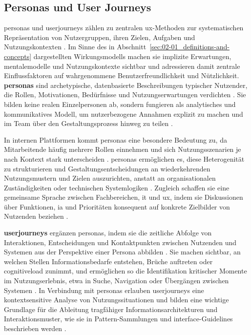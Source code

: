 \subsection{Personas und User Journeys}
\label{subsec:02-02-01_personas-and-journeys}

\Gls{personas} und \Gls{userjourneys} zählen zu zentralen \Gls{ux}-Methoden zur systematischen Repräsentation von Nutzergruppen, ihren Zielen, Aufgaben und Nutzungskontexten \cite{409:Cooper2014,410:Stickdorn2018}. Im Sinne des in Abschnitt~\ref{sec:02-01_definitions-and-concepts} dargestellten Wirkungsmodells machen sie implizite Erwartungen, \gls{mentalemodelle} und Nutzungskontexte sichtbar und adressieren damit zentrale Einflussfaktoren auf wahrgenommene Benutzerfreundlichkeit und Nützlichkeit. \textbf{\Gls{personas}} sind archetypische, datenbasierte Beschreibungen typischer Nutzender, die Rollen, Motivationen, Bedürfnisse und Nutzungserwartungen verdichten \cite{409:Cooper2014,905:Norman1983}. Sie bilden keine realen Einzelpersonen ab, sondern fungieren als analytisches und kommunikatives Modell, um nutzerbezogene Annahmen explizit zu machen und im Team über den Gestaltungsprozess hinweg zu teilen \cite{409:Cooper2014,410:Stickdorn2018}.

In internen Plattformen kommt \Gls{personas} eine besondere Bedeutung zu, da Mitarbeitende häufig mehrere Rollen einnehmen und sich Nutzungsszenarien je nach Kontext stark unterscheiden \cite{300:FraunhoferIESE2018,406:Albers2015}. \Gls{personas} ermöglichen es, diese Heterogenität zu strukturieren und Gestaltungsentscheidungen an wiederkehrenden Nutzungsmustern und Zielen auszurichten, anstatt an organisationalen Zuständigkeiten oder technischen Systemlogiken \cite{409:Cooper2014,406:Albers2015}. Zugleich schaffen sie eine gemeinsame Sprache zwischen Fachbereichen, \acrshort{it} und \Gls{ux}, indem sie Diskussionen über Funktionen, \Gls{ia} und Prioritäten konsequent auf konkrete Zielbilder von Nutzenden beziehen \cite{409:Cooper2014,410:Stickdorn2018}.

\textbf{\Gls{userjourneys}} ergänzen \Gls{personas}, indem sie die zeitliche Abfolge von Interaktionen, Entscheidungen und Kontaktpunkten zwischen Nutzenden und Systemen aus der Perspektive einer Persona abbilden \cite{410:Stickdorn2018}. Sie machen sichtbar, an welchen Stellen Informationsbedarfe entstehen, Brüche auftreten oder \gls{cognitiveload} zunimmt, und ermöglichen so die Identifikation kritischer Momente im Nutzungserlebnis, etwa in Suche, Navigation oder Übergängen zwischen Systemen \cite{410:Stickdorn2018,105:Sweller1988}. In Verbindung mit \Gls{personas} erlauben \Gls{userjourneys} eine kontextsensitive Analyse von Nutzungssituationen und bilden eine wichtige Grundlage für die Ableitung tragfähiger Informationsarchitekturen und Interaktionsmuster, wie sie in Pattern-Sammlungen und \Gls{interface}-Guidelines beschrieben werden \cite{303:Rosenfeld2015,411:Tidwell2020}.
